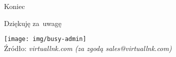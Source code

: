\documentclass[notes,polish,xcolor=dvipsnames,hyperref={unicode,hidelinks,pdftex,pdfauthor={Patryk Bęza},pdftitle={Protokół zarządzania stacjami komputerowymi pod kontrolą systemu Linux},pdfsubject={Praca dyplomowa magisterska na Wydziale Matematyki i Nauk Informacyjnych Politechniki Warszawskiej},pdfkeywords={Software Configuration Management, SCM, Infrastructure as Code, IaC, Linux, Communications Protocol},pdfproducer={XeLaTeX},pdfcreator={latexmk}}]{beamer}
\begin{document}
%
%
%
%


\begin{frame}{Koniec}

\begin{center}
	\LARGE Dziękuję za~uwagę\\[1em]
	\begin{minipage}{1.1\textheight}
		\texttt{[image: img/busy-admin]}\\
		\raggedleft\color{gray}\tiny Źródło: \emph{virtuallnk.com (za zgodą sales@virtuallnk.com)}
	\end{minipage}
\end{center}

\end{frame}

\end{document}
